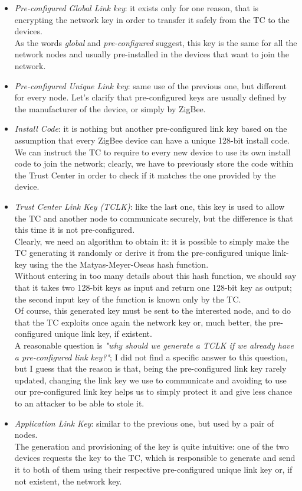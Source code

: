 \documentclass[12pt]{report}
\begin{document}
\begin{itemize}
\begin{itemize}
\item \emph{Pre-configured Global Link key}: it exists only for one reason, that is encrypting the network key in order to transfer it safely from the TC to the devices.\\
As the words \emph{global} and \emph{pre-configured} suggest, this key is the same for all the network nodes and usually pre-installed in the devices that want to join the network.
\item \emph{Pre-configured Unique Link key}: same use of the previous one, but different for every node.
Let's clarify that pre-configured keys are usually defined by the manufacturer of the device, or simply by ZigBee.
\item \emph{Install Code}: it is nothing but another pre-configured link key based on the assumption that every ZigBee device can have a unique 128-bit install code.\\
We can instruct the TC to require to every new device to use its own install code to join the network; clearly, we have to previously store the code within the Trust Center in order to check if it matches the one provided by the device.
\item \emph{Trust Center Link Key (TCLK)}: like the last one, this key is used to allow the TC and another node to communicate securely, but the difference is that this time it is not pre-configured.\\
Clearly, we need an algorithm to obtain it: it is possible to simply make the TC generating it randomly or derive it from the pre-configured unique link-key using the  the Matyas-Meyer-Oseas hash function.\\ 
Without entering in too many details about this hash function, we should say that it takes two 128-bit keys as input and return one 128-bit key as output; the second input key of the function is known only by the TC.\\
Of course, this generated key must be sent to the interested node, and to do that the TC exploits once again the network key or, much better, the pre-configured unique link key, if existent.\\
A reasonable question is \emph{"why should we generate a TCLK if we already have a pre-configured link key?"}; I did not find a specific answer to this question, but I guess that the reason is that, being the pre-configured link key rarely updated, changing the link key we use to communicate and avoiding to use our pre-configured link key helps us to simply protect it and give less chance to an attacker to be able to stole it.
\item \emph{Application Link Key}: similar to the previous one, but used by a pair of nodes.\\
The generation and provisioning of the key is quite intuitive: one of the two devices requests the key to the TC, which is responsible to generate and send it to both of them using their respective pre-configured unique link key or, if not existent, the network key.
\end{itemize}


\end{itemize}
\end{document}

